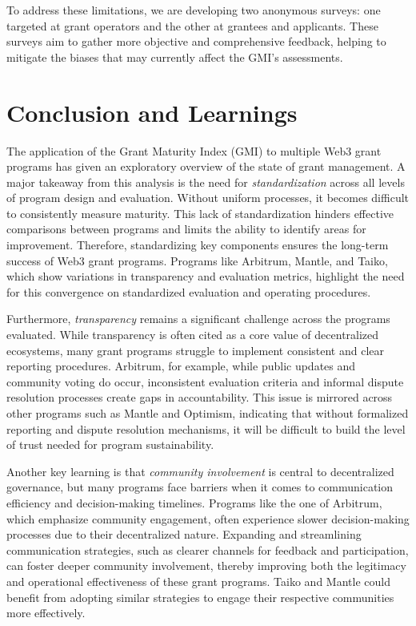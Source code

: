 \documentclass[a4,10pt]{article}
\begin{document}
To address these limitations, we are developing two anonymous surveys: one targeted at grant operators and the other at grantees and applicants. These surveys aim to gather more objective and comprehensive feedback, helping to mitigate the biases that may currently affect the GMI’s assessments.

\section{Conclusion and Learnings}\label{sec_12}
The application of the Grant Maturity Index (GMI) to multiple Web3 grant programs has given an exploratory overview of the state of grant management. A major takeaway from this analysis is the need for \textit{standardization} across all levels of program design and evaluation. Without uniform processes, it becomes difficult to consistently measure maturity. This lack of standardization hinders effective comparisons between programs and limits the ability to identify areas for improvement. Therefore, standardizing key components ensures the long-term success of Web3 grant programs. Programs like Arbitrum, Mantle, and Taiko, which show variations in transparency and evaluation metrics, highlight the need for this convergence on standardized evaluation and operating procedures.

Furthermore, \textit{transparency} remains a significant challenge across the programs evaluated. While transparency is often cited as a core value of decentralized ecosystems, many grant programs struggle to implement consistent and clear reporting procedures. Arbitrum, for example, while public updates and community voting do occur, inconsistent evaluation criteria and informal dispute resolution processes create gaps in accountability. This issue is mirrored across other programs such as Mantle and Optimism, indicating that without formalized reporting and dispute resolution mechanisms, it will be difficult to build the level of trust needed for program sustainability.

Another key learning is that \textit{community involvement} is central to decentralized governance, but many programs face barriers when it comes to communication efficiency and decision-making timelines. Programs like the one of Arbitrum, which emphasize community engagement, often experience slower decision-making processes due to their decentralized nature. Expanding and streamlining communication strategies, such as clearer channels for feedback and participation, can foster deeper community involvement, thereby improving both the legitimacy and operational effectiveness of these grant programs. Taiko and Mantle could benefit from adopting similar strategies to engage their respective communities more effectively.
\end{document}
